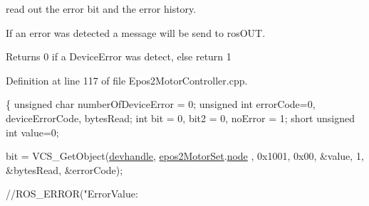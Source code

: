 read out the error bit and the error history. 

If an error was detected a message will be send to ros\-O\-U\-T.

\begin{DoxyReturn}{Returns}
0 if a Device\-Error was detect, else return 1 
\end{DoxyReturn}


Definition at line 117 of file Epos2\-Motor\-Controller.\-cpp.


\begin{DoxyCode}
\{
    \textcolor{keywordtype}{unsigned} \textcolor{keywordtype}{char} numberOfDeviceError = 0;
    \textcolor{keywordtype}{unsigned} \textcolor{keywordtype}{int} errorCode=0, deviceErrorCode, bytesRead;
    \textcolor{keywordtype}{int} bit = 0, bit2 = 0, noError = 1;
    \textcolor{keywordtype}{short} \textcolor{keywordtype}{unsigned} \textcolor{keywordtype}{int} value=0;

    bit = VCS\_GetObject(\hyperlink{classEpos2MotorController_a40594faab444bcba221ab9d55d1162cd}{devhandle}, \hyperlink{classEpos2MotorController_a0856f5fdd71ffa3b84a536afa085bfb1}{epos2MotorSet}.\hyperlink{structEpos2MotorController_1_1epos2Settings_ab8f18d3df17e8de9ed5250a3e53292c6}{node}
      , 0x1001, 0x00, &value, 1, &bytesRead, &errorCode);

    \textcolor{comment}{//ROS\_ERROR("ErrorValue: %

}
\end{DoxyCode}
